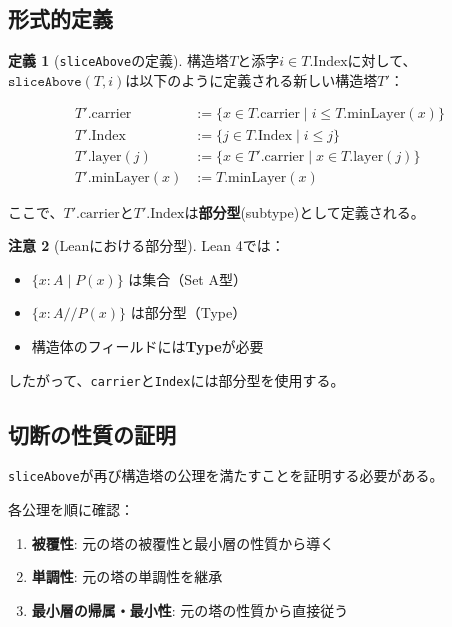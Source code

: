 \documentclass[a4paper,11pt]{article}
\theoremstyle{definition}
\newtheorem{definition}{定義}[section]
\newtheorem{remark}[definition]{注意}
\begin{document}
\subsection{形式的定義}

\begin{definition}[\texttt{sliceAbove}の定義]
構造塔$T$と添字$i \in T.\text{Index}$に対して、$\texttt{sliceAbove}(T, i)$は以下のように定義される新しい構造塔$T'$：

\begin{align*}
T'.\text{carrier} &:= \{x \in T.\text{carrier} \mid i \leq T.\text{minLayer}(x)\} \\
T'.\text{Index} &:= \{j \in T.\text{Index} \mid i \leq j\} \\
T'.\text{layer}(j) &:= \{x \in T'.\text{carrier} \mid x \in T.\text{layer}(j)\} \\
T'.\text{minLayer}(x) &:= T.\text{minLayer}(x)
\end{align*}

ここで、$T'.\text{carrier}$と$T'.\text{Index}$は\textbf{部分型}(subtype)として定義される。
\end{definition}

\begin{remark}[Leanにおける部分型]
Lean 4では：
\begin{itemize}
    \item $\{x : A \mid P(x)\}$ は集合（Set A型）
    \item $\{x : A \mathbin{//} P(x)\}$ は部分型（Type）
    \item 構造体のフィールドには\textbf{Type}が必要
\end{itemize}
したがって、\texttt{carrier}と\texttt{Index}には部分型を使用する。
\end{remark}

\subsection{切断の性質の証明}

\texttt{sliceAbove}が再び構造塔の公理を満たすことを証明する必要がある。

\begin{proofstrategy}
各公理を順に確認：
\begin{enumerate}
    \item \textbf{被覆性}: 元の塔の被覆性と最小層の性質から導く
    \item \textbf{単調性}: 元の塔の単調性を継承
    \item \textbf{最小層の帰属・最小性}: 元の塔の性質から直接従う
\end{enumerate}
\end{proofstrategy}
\end{document}
